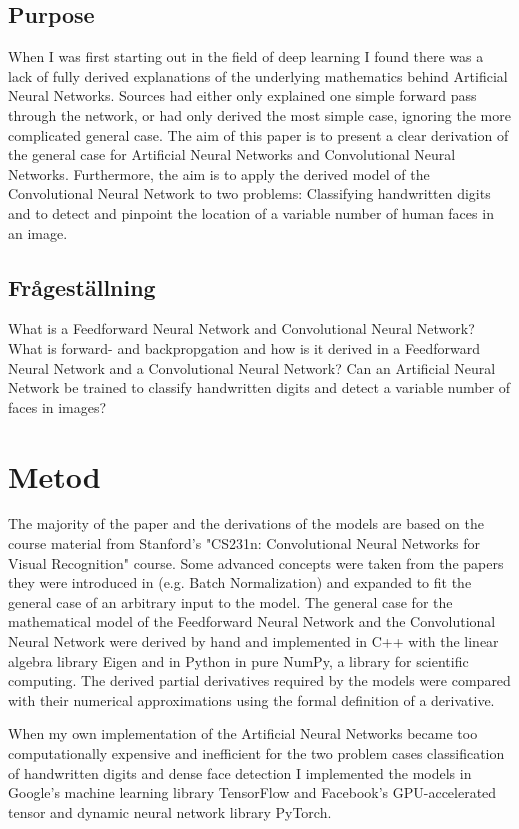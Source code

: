 \documentclass[a4paper,11pt,twoside]{article}
\begin{document}
\subsection{Purpose}
When I was first starting out in the field of deep learning I found there was a lack of fully derived explanations of the underlying mathematics behind Artificial Neural Networks. Sources had either only explained one simple forward pass through the network, or had only derived the most simple case, ignoring the more complicated general case. The aim of this paper is to present a clear derivation of the general case for Artificial Neural Networks and Convolutional Neural Networks. Furthermore, the aim is to apply the derived model of the Convolutional Neural Network to two problems: Classifying handwritten digits and to detect and pinpoint the location of a variable number of human faces in an image.

\subsection{Frågeställning}
What is a Feedforward Neural Network and Convolutional Neural Network?
What is forward- and backpropgation and how is it derived in a Feedforward Neural Network and a Convolutional Neural Network?
Can an Artificial Neural Network be trained to classify handwritten digits and detect a variable number of faces in images?

\newpage
\section{Metod}
The majority of the paper and the derivations of the models are based on the course material from Stanford's "CS231n: Convolutional Neural Networks for Visual Recognition" course. Some advanced concepts were taken from the papers they were introduced in (e.g. Batch Normalization) and expanded to fit the general case of an arbitrary input to the model. The general case for the mathematical model of the Feedforward Neural Network and the Convolutional Neural Network were derived by hand and implemented in C++ with the linear algebra library Eigen and in Python in pure NumPy, a library for scientific computing. The derived partial derivatives required by the models were compared with their numerical approximations using the formal definition of a derivative. 

When my own implementation of the Artificial Neural Networks became too computationally expensive and inefficient for the two problem cases classification of handwritten digits and dense face detection I implemented the models in Google's machine learning library TensorFlow and Facebook's GPU-accelerated tensor and dynamic neural network library PyTorch.
\end{document}
